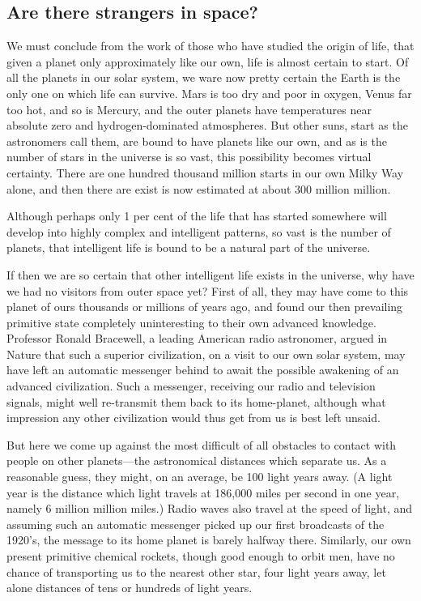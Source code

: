 \documentclass[11pt]{article}
\begin{document}
\subsection{Are there strangers in space?}
\label{sec-2-43}

We must conclude from the work of those who have studied the origin of life, that given a planet only approximately like our own, life is almost certain to start. Of all the planets in our solar system, we ware now pretty certain the Earth is the only one on which life can survive. Mars is too dry and poor in oxygen, Venus far too hot, and so is Mercury, and the outer planets have temperatures near absolute zero and hydrogen-dominated atmospheres. But other suns, start as the astronomers call them, are bound to have planets like our own, and as is the number of stars in the universe is so vast, this possibility becomes virtual certainty. There are one hundred thousand million starts in our own Milky Way alone, and then there are exist is now estimated at about 300 million million.

Although perhaps only 1 per cent of the life that has started somewhere will develop into highly complex and intelligent patterns, so vast is the number of planets, that intelligent life is bound to be a natural part of the universe.

If then we are so certain that other intelligent life exists in the universe, why have we had no visitors from outer space yet? First of all, they may have come to this planet of ours thousands or millions of years ago, and found our then prevailing primitive state completely uninteresting to their own advanced knowledge. Professor Ronald Bracewell, a leading American radio astronomer, argued in Nature that such a superior civilization, on a visit to our own solar system, may have left an automatic messenger behind to await the possible awakening of an advanced civilization. Such a messenger, receiving our radio and television signals, might well re-transmit them back to its home-planet, although what impression any other civilization would thus get from us is best left unsaid.

But here we come up against the most difficult of all obstacles to contact with people on other planets---the astronomical distances which separate us. As a reasonable guess, they might, on an average, be 100 light years away. (A light year is the distance which light travels at 186,000 miles per second in one year, namely 6 million million miles.) Radio waves also travel at the speed of light, and assuming such an automatic messenger picked up our first broadcasts of the 1920's, the message to its home planet is barely halfway there. Similarly, our own present primitive chemical rockets, though good enough to orbit men, have no chance of transporting us to the nearest other star, four light years away, let alone distances of tens or hundreds of light years.
\end{document}
